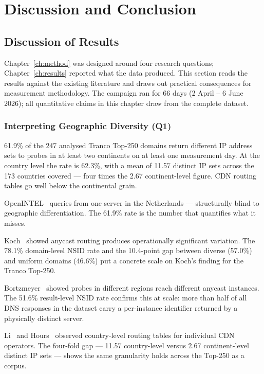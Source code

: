 \chapter{Discussion and Conclusion}
\label{ch:conclusion}

\section{Discussion of Results}
\label{sec:5.1}

Chapter~\ref{ch:method} was designed around four research questions; Chapter~\ref{ch:results} reported what the data produced. This section reads the results against the existing literature and draws out practical consequences for measurement methodology. The campaign ran for 66 days (2 April -- 6 June 2026); all quantitative claims in this chapter draw from the complete dataset.

\bigskip
\subsection{Interpreting Geographic Diversity (Q1)}
\label{subsec:5.1.1}

61.9\% of the 247 analysed Tranco Top-250 domains return different \ac{IP} address sets to probes in at least two continents on at least one measurement day. At the country level the rate is 62.3\%, with a mean of 11.57 distinct \ac{IP} sets across the 173 countries covered --- four times the 2.67 continent-level figure. \ac{CDN} routing tables go well below the continental grain.

OpenINTEL~\cite{vanRijswijk2016} queries from one server in the Netherlands --- structurally blind to geographic differentiation. The 61.9\% rate is the number that quantifies what it misses.

Koch~\cite{Koch2021} showed anycast routing produces operationally significant variation. The 78.1\% domain-level \ac{NSID} rate and the 10.4-point gap between diverse (57.0\%) and uniform domains (46.6\%) put a concrete scale on Koch's finding for the Tranco Top-250.

Bortzmeyer~\cite{Bortzmeyer2013} showed probes in different regions reach different anycast instances. The 51.6\% result-level \ac{NSID} rate confirms this at scale: more than half of all \ac{DNS} responses in the dataset carry a per-instance identifier returned by a physically distinct server.

Li~\cite{Li2025} and Hours~\cite{Hours2016} observed country-level routing tables for individual \ac{CDN} operators. The four-fold gap --- 11.57 country-level versus 2.67 continent-level distinct \ac{IP} sets --- shows the same granularity holds across the Top-250 as a corpus.

